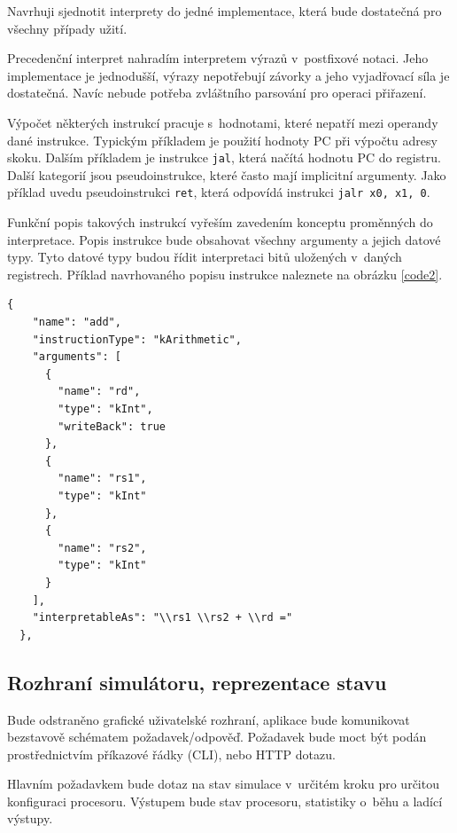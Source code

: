 Navrhuji sjednotit interprety do jedné implementace, která bude dostatečná pro všechny případy užití.

Precedenční interpret nahradím interpretem výrazů v~postfixové notaci. Jeho implementace je jednodušší, výrazy nepotřebují závorky a jeho vyjadřovací síla je dostatečná.
Navíc nebude potřeba zvláštního parsování pro operaci přiřazení.

Výpočet některých instrukcí pracuje s~hodnotami, které nepatří mezi operandy dané instrukce. Typickým příkladem je použití hodnoty PC při výpočtu adresy skoku. Dalším příkladem je instrukce \texttt{jal}, která načítá hodnotu PC do registru. Další kategorií jsou pseudoinstrukce, které často mají implicitní argumenty. Jako příklad uvedu pseudoinstrukci \texttt{ret}, která odpovídá instrukci \texttt{jalr x0, x1, 0}.

Funkční popis takových instrukcí vyřeším zavedením konceptu proměnných do interpretace. Popis instrukce bude obsahovat všechny argumenty a jejich datové typy. Tyto datové typy budou řídit interpretaci bitů uložených v~daných registrech.
Příklad navrhovaného popisu instrukce naleznete na obrázku \ref{code2}.

\begin{lstlisting}[caption={Nový popis instrukce \texttt{add} detailně popisuje argumenty a jejich datové typy.},captionpos=b,label=code2]
   {
    "name": "add",
    "instructionType": "kArithmetic",
    "arguments": [
      {
        "name": "rd",
        "type": "kInt",
        "writeBack": true
      },
      {
        "name": "rs1",
        "type": "kInt"
      },
      {
        "name": "rs2",
        "type": "kInt"
      }
    ],
    "interpretableAs": "\\rs1 \\rs2 + \\rd ="
  },
\end{lstlisting}



\subsection{Rozhraní simulátoru, reprezentace stavu}

Bude odstraněno grafické uživatelské rozhraní, aplikace bude komunikovat bezstavově schématem požadavek/odpověď.
Požadavek bude moct být podán prostřednictvím příkazové řádky (CLI), nebo HTTP dotazu.

Hlavním požadavkem bude dotaz na stav simulace v~určitém kroku pro určitou konfiguraci procesoru.
Výstupem bude stav procesoru, statistiky o~běhu a ladící výstupy.

